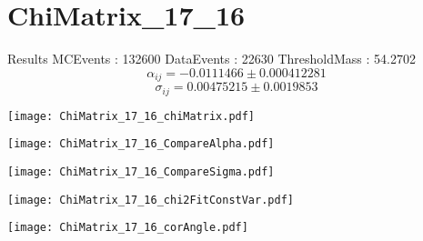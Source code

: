 \documentclass[a4paper,12pt]{article}
\begin{document}
\section{ChiMatrix\_17\_16}
\begin{minipage}{0.49\linewidth} Results \newline
MCEvents : 132600\newline
DataEvents : 22630 \newline
ThresholdMass : 54.2702\\
$$\alpha_{ij} = -0.0111466\pm 0.000412281$$
$$\sigma_{ij} = 0.00475215\pm 0.0019853$$
\end{minipage}\hfill
\begin{minipage}{0.49\linewidth} 
\texttt{[image: ChiMatrix\_17\_16\_chiMatrix.pdf]}\\
\end{minipage}
\hfill
\begin{minipage}{0.49\linewidth} 
\texttt{[image: ChiMatrix\_17\_16\_CompareAlpha.pdf]}\\
\end{minipage}
\hfill
\begin{minipage}{0.49\linewidth} 
\texttt{[image: ChiMatrix\_17\_16\_CompareSigma.pdf]}\\
\end{minipage}
\begin{minipage}{0.49\linewidth} 
\texttt{[image: ChiMatrix\_17\_16\_chi2FitConstVar.pdf]}\\
\end{minipage}
\hfill
\begin{minipage}{0.49\linewidth} 
\texttt{[image: ChiMatrix\_17\_16\_corAngle.pdf]}\\
\end{minipage}
\end{document}
